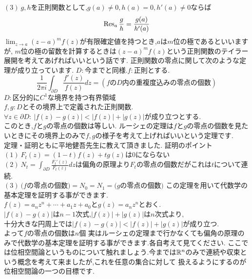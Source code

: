 $(3)\ g,h$を正則関数として,$g(a)\neq 0,h(a)=0,h'(a)\neq 0$ならば
\[
\mathop{\mathrm{Res}}\nolimits_{a} \frac{g}{h} = \frac{g(a)}{h'(a)}
\]
\propx
$\lim_{z\to a} (z-a)^m f(z)$が有限確定値を持つとき,$a$は$m$位の極であるといいますが,
$m$位の極の留数を計算するときは$(z-a)^m f(z)$という正則関数のテイラー展開を考えてあげればいいという話です.
正則関数の零点に関して次のような定理が成り立っています.
\thm[偏角の原理]
$D:$今までと同様.$f:$正則とする.
\[
\frac{1}{2 \pi i} \int_{\partial D} \frac{f'(z)}{f(z)}dz = (f\mbox{の}D\mbox{内の重複度込みの零点の個数})
\]
\thmx
\thm[ルーシェの定理]
$D:$区分的に$C^1$な境界を持つ有界領域\\
$f,g:D$とその境界上で定義された正則関数.\\
$\forall z \in \partial D :\ |f(z)-g(z)|<|f(z)|+|g(z)|$が成り立つとする.\\
このとき,$f$と$g$の零点の個数は等しい.
\thmx
ルーシェの定理は$f$と$g$の零点の個数を見たいときにその境界上のみで$f,g$の様子を考えて上げればいいという定理です.
\proof
\leavevmode\\
定理・証明ともに平地健吾先生に教えて頂きました.
証明のポイント\\
$(1)\ F_t(z) = (1-t) f(z) + t g(z)$は$0$にならない\\
$(2)\ N_t=\int_{\partial D} \frac{F_t'(z)}{F_t(z)}dz$は偏角の原理より$F_t$の零点の個数だがこれは$t$について連続.\\
$(3)\ (f$の零点の個数$)=N_0=N_1=(g$の零点の個数$)$
\proofx
この定理を用いて代数学の基本定理を証明する事ができます.
\proof[ルーシェの定理を用いた代数学の基本定理の証明]
\leavevmode\\

$f(z)=a_n z^n + \cdots + a_1 z+ a_0$と$g(z)=a_n z^n$とおく.\\
$|f(z)-g(z)|$は$n-1$次式,$|f(z)|+|g(z)|$は$n$次式より,\\
十分大きな円周上では$|f(z)-g(z)|<|f(z)|+|g(z)|$が成り立つ.\\
よって$f$の零点の個数は$n$個
\proofx
\prob
実はルーシェの定理まで行かなくても偏角の原理のみで代数学の基本定理を証明する事ができます.各自考えて見てください.
\probx
{}
ここでは位相空間論というものについて触れましょう.今までは$\mathbb R^n$のみで連続や収束という概念を考えて来ましたが,これを任意の集合に対して
扱えるようにするのが位相空間論の一つの目標です.

